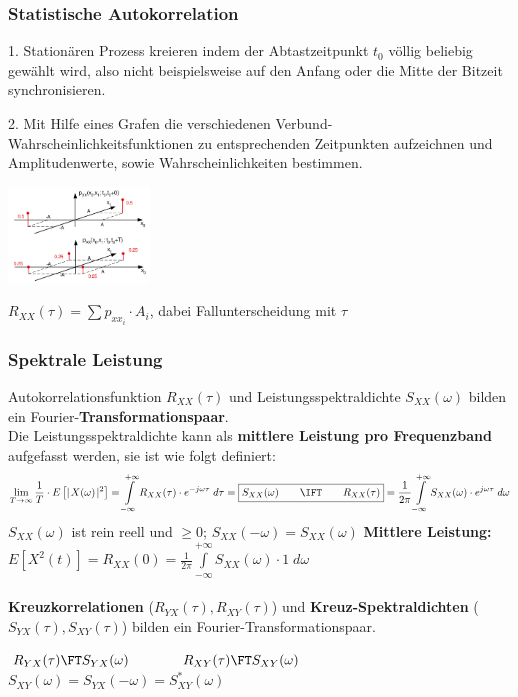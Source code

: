 \subsubsection{Statistische Autokorrelation}
	\parbox{5cm}{1. Stationären Prozess kreieren indem der Abtastzeitpunkt $t_0$ völlig beliebig gewählt wird, also nicht beispielsweise auf den Anfang oder die Mitte der Bitzeit synchronisieren.}
	\hspace{0.25cm}
	\parbox{5cm}{2. Mit Hilfe eines Grafen die verschiedenen Verbund-Wahrscheinlichkeitsfunktionen zu entsprechenden Zeitpunkten aufzeichnen und Amplitudenwerte, sowie Wahrscheinlichkeiten bestimmen.}
	\hspace{0.25cm}
	\parbox{3.75cm}{\includegraphics[width = 3.75cm]{./bilder/07_stat_autokorr}}
	\hspace{0.25cm}
	\parbox{4cm}{$R_{XX}(\tau)=\sum p_{xx_i} \cdot A_i$, dabei Fallunterscheidung mit $\tau$}
	

\subsubsection{Spektrale Leistung }
Autokorrelationsfunktion $R_{XX}(\tau)$ und Leistungsspektraldichte $S_{XX}(\omega)$ bilden ein
Fourier-\textbf{Transformationspaar}. \\ Die Leistungsspektraldichte kann als \textbf{mittlere Leistung pro Frequenzband }aufgefasst werden, sie ist
wie folgt definiert:                             
        $$ \lim\limits_{T \rightarrow \infty} \frac{1}{T} \cdot E\left[  \mid\!
        X(\omega) \!\mid^{2}\right] = \int\limits_{-\infty}^{+\infty}
        R_{XX}(\tau) \cdot e^{-j\omega\tau} \; d\tau = \boxed{S_{XX}(\omega)
        \qquad \IFT \qquad R_{XX}(\tau)} = \frac{1}{2\pi}
        \int\limits_{-\infty}^{+\infty}S_{XX}(\omega) \cdot e^{j\omega\tau} \;
        d\omega$$ 
        $S_{XX}(\omega)$ ist rein reell und $\geq 0$; $S_{XX}(-\omega) = S_{XX}(\omega)$ \qquad
        \textbf{Mittlere Leistung:} $ E[X^2(t)] = R_{XX}(0) = \frac{1}{2\pi} \int\limits_{-\infty}^{+\infty}S_{XX}(\omega)\cdot1 \; d\omega $\\ \\
\textbf{Kreuzkorrelationen} ($R_{YX}(\tau), R_{XY}(\tau)$) und \textbf{Kreuz-Spektraldichten} ($S_{YX}(\tau),
S_{XY}(\tau)$) bilden ein Fourier-Transformationspaar.
\begin{center}
	$R_{YX}(\tau) \FT S_{YX}(\omega) \qquad \qquad R_{XY}(\tau) \FT S_{XY}(\omega)$\\
	$S_{XY}(\omega) = S_{YX}(-\omega) = S_{XY}^{\ast}(\omega)$
\end{center}

